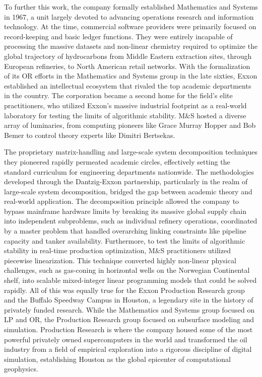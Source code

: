 To further this work, the company formally established Mathematics and Systems in 1967, a unit largely devoted to advancing operations research and information technology. At the time, commercial software providers were primarily focused on record-keeping and basic ledger functions. They were entirely incapable of processing the massive datasets and non-linear chemistry required to optimize the global trajectory of hydrocarbons from Middle Eastern extraction sites, through European refineries, to North American retail networks. With the formalization of its OR efforts in the Mathematics and Systems group in the late sixties, Exxon established an intellectual ecosystem that rivaled the top academic departments in the country. The corporation became a second home for the field’s elite practitioners, who utilized Exxon’s massive industrial footprint as a real-world laboratory for testing the limits of algorithmic stability. M\&S hosted a diverse array of luminaries, from computing pioneers like Grace Murray Hopper and Bob Bemer to control theory experts like Dimitri Bertsekas. 

The proprietary matrix-handling and large-scale system decomposition techniques they pioneered rapidly permeated academic circles, effectively setting the standard curriculum for engineering departments nationwide. The methodologies developed through the Dantzig-Exxon partnership, particularly in the realm of large-scale system decomposition, bridged the gap between academic theory and real-world application. The decomposition principle allowed the company to bypass mainframe hardware limits by breaking its massive global supply chain into independent subproblems, such as individual refinery operations, coordinated by a master problem that handled overarching linking constraints like pipeline capacity and tanker availability. Furthermore, to test the limits of algorithmic stability in real-time production optimization, M\&S practitioners utilized piecewise linearization. This technique converted highly non-linear physical challenges, such as gas-coning in horizontal wells on the Norwegian Continental shelf, into scalable mixed-integer linear programming models that could be solved rapidly. 
All of this was equally true for the Exxon Production Research group and the Buffalo Speedway Campus in Houston, a legendary site in the history of privately funded research. While the Mathematics and Systems group focused on LP and OR, the Production Research group focused on subsurface modeling and simulation. Production Research is where the company housed some of the most powerful privately owned supercomputers in the world and transformed the oil industry from a field of empirical exploration into a rigorous discipline of digital simulation, establishing Houston as the global epicenter of computational geophysics. 

